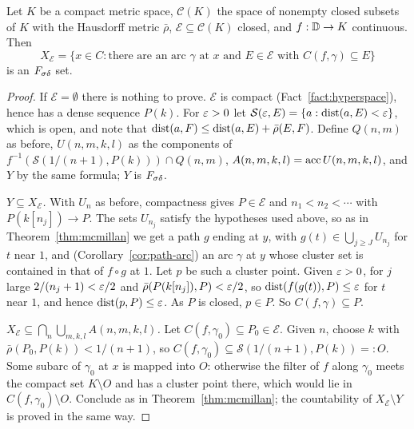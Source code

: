 \begin{theorem}\label{thm:mm-thm2}
Let $K$ be a compact metric space, $\mathcal C(K)$ the space of nonempty closed subsets of $K$ with the
Hausdorff metric $\bar\rho$, $\mathcal E\subseteq\mathcal C(K)$ closed, and $f:\mathbb{D}\to K$ continuous. Then
\[
X_{\mathcal E}=\{x\in C:\text{there are an arc $\gamma$ at $x$ and $E\in\mathcal E$ with }C(f,\gamma)\subseteq E\}
\]
is an $F_{\sigma\delta}$ set.
\end{theorem}
\begin{proof}
If $\mathcal E=\emptyset$ there is nothing to prove. $\mathcal E$ is compact (Fact~\ref{fact:hyperspace}), hence has a dense sequence
$P(k)$. For $\varepsilon>0$ let $\mathcal S(\varepsilon,E)=\{a:\operatorname{dist}(a,E)<\varepsilon\}$, which is open, and note that
$\operatorname{dist}(a,F)\le\operatorname{dist}(a,E)+\bar\rho(E,F)$. Define $Q(n,m)$ as before, $U(n,m,k,l)$ as the
components of $f^{-1}(\mathcal S(1/(n+1),P(k)))\cap Q(n,m)$, $A(n,m,k,l)=\operatorname{acc} U(n,m,k,l)$, and $Y$ by the same
formula; $Y$ is $F_{\sigma\delta}$.

\emph{$Y\subseteq X_{\mathcal E}$.} With $U_n$ as before, compactness gives $P\in\mathcal E$ and
$n_1<n_2<\cdots$ with $P(k[n_j])\to P$. The sets $U_{n_j}$ satisfy the hypotheses used above, so as in
Theorem~\ref{thm:mcmillan} we get a path $g$ ending at $y$, with $g(t)\in\bigcup_{j\ge J}U_{n_j}$ for $t$ near $1$,
and (Corollary~\ref{cor:path-arc}) an arc $\gamma$ at $y$ whose cluster set is contained in that of $f\circ g$ at $1$.
Let $p$ be such a cluster point. Given $\varepsilon>0$, for $j$ large $2/(n_j+1)<\varepsilon/2$ and
$\bar\rho(P(k[n_j]),P)<\varepsilon/2$, so $\operatorname{dist}(f(g(t)),P)\le\varepsilon$ for $t$ near $1$, and hence $\operatorname{dist}(p,P)\le\varepsilon$. As $P$
is closed, $p\in P$. So $C(f,\gamma)\subseteq P$.

\emph{$X_{\mathcal E}\subseteq\bigcap_n\bigcup_{m,k,l}A(n,m,k,l)$.} Let $C(f,\gamma_0)\subseteq P_0\in\mathcal E$.
Given $n$, choose $k$ with $\bar\rho(P_0,P(k))<1/(n+1)$, so $C(f,\gamma_0)\subseteq\mathcal S(1/(n+1),P(k))=:O$. Some
subarc of $\gamma_0$ at $x$ is mapped into $O$: otherwise the filter of $f$ along $\gamma_0$ meets the compact
set $K\setminus O$ and has a cluster point there, which would lie in $C(f,\gamma_0)\setminus O$. Conclude as in
Theorem~\ref{thm:mcmillan}; the countability of $X_{\mathcal E}\setminus Y$ is proved in the same way.
\end{proof}

